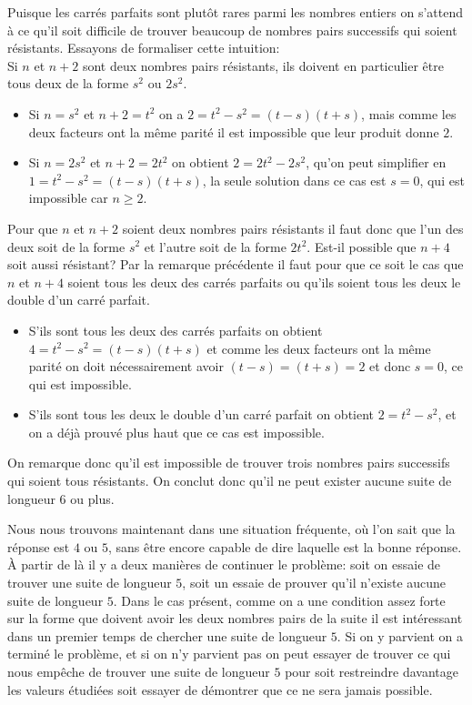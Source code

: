 {Puisque les carrés parfaits sont plutôt rares parmi les nombres entiers on s'attend à ce qu'il soit difficile de trouver beaucoup de nombres pairs successifs qui soient résistants. Essayons de formaliser cette intuition:\\
Si $n$ et $n+2$ sont deux nombres pairs résistants, ils doivent en particulier être tous deux de la forme $s^2$ ou $2 s^2$.
\begin{itemize}
    \item Si $n = s^2$ et $n+2 = t^2$ on a $2 = t^2 - s^2 = (t-s)(t+s)$, mais comme les deux facteurs ont la même parité il est impossible que leur produit donne $2$.
    \item Si $n = 2 s^2$ et $n+2 = 2 t^2$ on obtient $2 = 2 t^2 - 2 s^2$, qu'on peut simplifier en $1 = t^2-s^2 = (t-s)(t+s)$, la seule solution dans ce cas est $s=0$, qui est impossible car $n\geq 2$.
\end{itemize}
Pour que $n$ et $n+2$ soient deux nombres pairs résistants il faut donc que l'un des deux soit de la forme $s^2$ et l'autre soit de la forme $2 t^2$. Est-il possible que $n+4$ soit aussi résistant? Par la remarque précédente il faut pour que ce soit le cas que $n$ et $n+4$ soient tous les deux des carrés parfaits ou qu'ils soient tous les deux le double d'un carré parfait.
\begin{itemize}
    \item S'ils sont tous les deux des carrés parfaits on obtient $4 = t^2 - s^2 = (t-s)(t+s)$ et comme les deux facteurs ont la même parité on doit nécessairement avoir $(t-s) = (t+s) = 2$ et donc $s=0$, ce qui est impossible.
    \item S'ils sont tous les deux le double d'un carré parfait on obtient $2 = t^2 - s^2$, et on a déjà prouvé plus haut que ce cas est impossible.
\end{itemize}
On remarque donc qu'il est impossible de trouver trois nombres pairs successifs qui soient tous résistants. On conclut donc qu'il ne peut exister aucune suite de longueur 6 ou plus.

Nous nous trouvons maintenant dans une situation fréquente, où l'on sait que la réponse est $4$ ou $5$, sans être encore capable de dire laquelle est la bonne réponse. À partir de là il y a deux manières de continuer le problème: soit on essaie de trouver une suite de longueur $5$, soit un essaie de prouver qu'il n'existe aucune suite de longueur $5$. Dans le cas présent, comme on a une condition assez forte sur la forme que doivent avoir les deux nombres pairs de la suite il est intéressant dans un premier temps de chercher une suite de longueur $5$. Si on y parvient on a terminé le problème, et si on n'y parvient pas on peut essayer de trouver ce qui nous empêche de trouver une suite de longueur $5$ pour soit restreindre davantage les valeurs étudiées soit essayer de démontrer que ce ne sera jamais possible.

}
